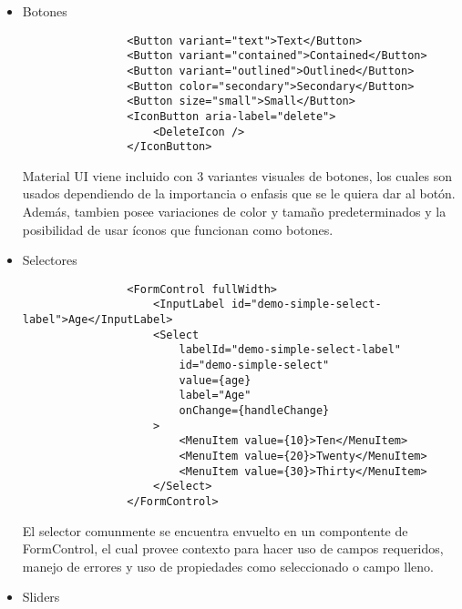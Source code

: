 \begin{itemize}
    \item Botones\\

          \begin{lstlisting}
                <Button variant="text">Text</Button>
                <Button variant="contained">Contained</Button>
                <Button variant="outlined">Outlined</Button>
                <Button color="secondary">Secondary</Button>
                <Button size="small">Small</Button>
                <IconButton aria-label="delete">
                    <DeleteIcon />
                </IconButton>
            \end{lstlisting}

          Material UI viene incluido con 3 variantes visuales de botones, los cuales son usados dependiendo de la importancia o enfasis que se le quiera dar al botón. Además, tambien posee variaciones de color y tamaño predeterminados y la posibilidad de usar íconos que funcionan como botones.

    \item Selectores\\

          \begin{lstlisting}
                <FormControl fullWidth>
                    <InputLabel id="demo-simple-select-label">Age</InputLabel>
                    <Select
                        labelId="demo-simple-select-label"
                        id="demo-simple-select"
                        value={age}
                        label="Age"
                        onChange={handleChange}
                    >
                        <MenuItem value={10}>Ten</MenuItem>
                        <MenuItem value={20}>Twenty</MenuItem>
                        <MenuItem value={30}>Thirty</MenuItem>
                    </Select>
                </FormControl>
            \end{lstlisting}

          El selector comunmente se encuentra envuelto en un compontente de FormControl, el cual provee contexto para hacer uso de campos requeridos, manejo de errores y uso de propiedades como seleccionado o campo lleno.

    \item Sliders\\


\end{itemize}
